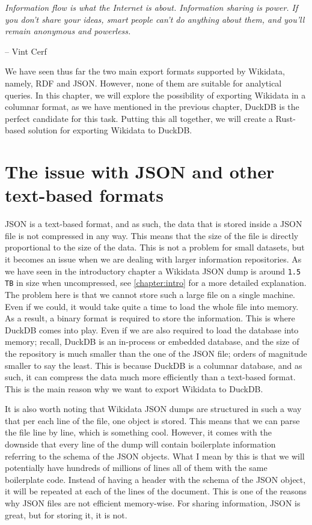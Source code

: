 \epigraph{\textit{Information flow is what the Internet is about. Information sharing is power. If you don't share your ideas, smart people can't do anything about them, and you'll remain anonymous and powerless.}}{-- \textup{Vint Cerf}}

We have seen thus far the two main export formats supported by Wikidata, namely, RDF and JSON. However, none of them are suitable for analytical queries. In this chapter, we will explore the possibility of exporting Wikidata in a columnar format, as we have mentioned in the previous chapter, DuckDB is the perfect candidate for this task. Putting this all together, we will create a Rust-based solution for exporting Wikidata to DuckDB.

\section{The issue with JSON and other text-based formats}

JSON is a text-based format, and as such, the data that is stored inside a JSON file is not compressed in any way. This means that the size of the file is directly proportional to the size of the data. This is not a problem for small datasets, but it becomes an issue when we are dealing with larger information repositories. As we have seen in the introductory chapter a Wikidata JSON dump is around \texttt{1.5 TB} in size when uncompressed, see \ref{chapter:intro} for a more detailed explanation. The problem here is that we cannot store such a large file on a single machine. Even if we could, it would take quite a time to load the whole file into memory. As a result, a binary format is required to store the information. This is where DuckDB comes into play. Even if we are also required to load the database into memory; recall, DuckDB is an in-process or embedded database, and the size of the repository is much smaller than the one of the JSON file; orders of magnitude smaller to say the least. This is because DuckDB is a columnar database, and as such, it can compress the data much more efficiently than a text-based format. This is the main reason why we want to export Wikidata to DuckDB.

It is also worth noting that Wikidata JSON dumps are structured in such a way that per each line of the file, one object is stored. This means that we can parse the file line by line, which is something cool. However, it comes with the downside that every line of the dump will contain boilerplate information referring to the schema of the JSON objects. What I mean by this is that we will potentially have hundreds of millions of lines all of them with the same boilerplate code. Instead of having a header with the schema of the JSON object, it will be repeated at each of the lines of the document. This is one of the reasons why JSON files are not efficient memory-wise. For sharing information, JSON is great, but for storing it, it is not.

